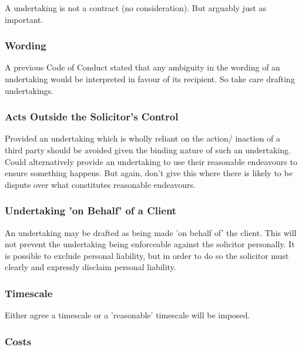 \documentclass[
]{article}
\begin{document}
A undertaking is not a contract (no consideration). But arguably just as
important.

\hypertarget{wording}{%
\subsubsection{Wording}\label{wording}}

A previous Code of Conduct stated that any ambiguity in the wording of
an undertaking would be interpreted in favour of its recipient. So take
care drafting undertakings.

\hypertarget{acts-outside-the-solicitors-control}{%
\subsubsection{Acts Outside the Solicitor's
Control}\label{acts-outside-the-solicitors-control}}

Provided an undertaking which is wholly reliant on the action/ inaction
of a third party should be avoided given the binding nature of such an
undertaking. Could alternatively provide an undertaking to use their
reasonable endeavours to ensure something happens. But again, don't give
this where there is likely to be dispute over what constitutes
reasonable endeavours.

\hypertarget{undertaking-on-behalf-of-a-client}{%
\subsubsection{Undertaking 'on Behalf' of a
Client}\label{undertaking-on-behalf-of-a-client}}

An undertaking may be drafted as being made 'on behalf of' the client.
This will not prevent the undertaking being enforceable against the
solicitor personally. It is possible to exclude personal liability, but
in order to do so the solicitor must clearly and expressly disclaim
personal liability.

\hypertarget{timescale}{%
\subsubsection{Timescale}\label{timescale}}

Either agree a timescale or a 'reasonable' timescale will be imposed.

\hypertarget{costs}{%
\subsubsection{Costs}\label{costs}}
\end{document}
